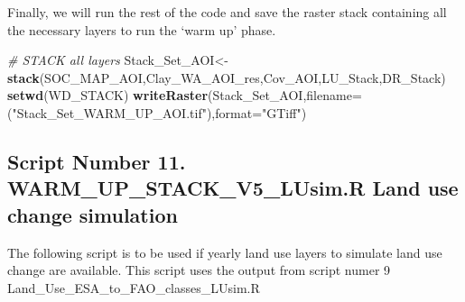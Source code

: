 \documentclass[
  10pt,
  b5paper,
]{book}
\newenvironment{Shaded}{\begin{snugshade}}{\end{snugshade}}
\newcommand{\CommentTok}[1]{\textcolor[rgb]{0.56,0.35,0.01}{\textit{#1}}}
\newcommand{\DataTypeTok}[1]{\textcolor[rgb]{0.13,0.29,0.53}{#1}}
\newcommand{\KeywordTok}[1]{\textcolor[rgb]{0.13,0.29,0.53}{\textbf{#1}}}
\newcommand{\NormalTok}[1]{#1}
\newcommand{\StringTok}[1]{\textcolor[rgb]{0.31,0.60,0.02}{#1}}
\begin{document}
Finally, we will run the rest of the code and save the raster stack containing all the necessary layers to run the `warm up' phase.

\begin{Shaded}
\begin{Highlighting}[]
\CommentTok{# STACK all layers}
\NormalTok{Stack_Set_AOI<-}\KeywordTok{stack}\NormalTok{(SOC_MAP_AOI,Clay_WA_AOI_res,Cov_AOI,LU_Stack,DR_Stack)}
\KeywordTok{setwd}\NormalTok{(WD_STACK)}
\KeywordTok{writeRaster}\NormalTok{(Stack_Set_AOI,}\DataTypeTok{filename=}\NormalTok{(}\StringTok{"Stack_Set_WARM_UP_AOI.tif"}\NormalTok{),}\DataTypeTok{format=}\StringTok{"GTiff"}\NormalTok{)}
\end{Highlighting}
\end{Shaded}

\hypertarget{script-number-11.-warm_up_stack_v5_lusim.r-land-use-change-simulation}{%
\subsection{Script Number 11. WARM\_UP\_STACK\_V5\_LUsim.R Land use change simulation}\label{script-number-11.-warm_up_stack_v5_lusim.r-land-use-change-simulation}}

The following script is to be used if yearly land use layers to simulate land use change are available. This script uses the output from script numer 9 Land\_Use\_ESA\_to\_FAO\_classes\_LUsim.R
\end{document}
